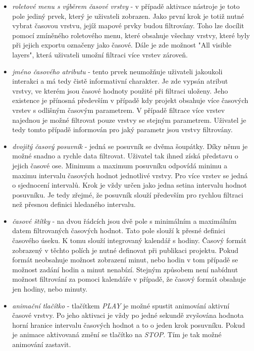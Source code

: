 \begin{itemize}
	\item\textit{roletové menu s výběrem časové vrstvy} - v případě aktivace nástroje je toto pole jediný prvek, který je uživateli zobrazen. Jako první krok je totiž nutné vybrat časovou vrstvu, jejíž mapové prvky budou filtrovány. Toho lze docílit pomocí zmíněného roletového menu, které obsahuje všechny vrstvy, které byly při jejich exportu označeny jako časové. Dále je zde možnost "All visible layers", která uživateli umožní filtraci více vrstev zároveň.
	\item\textit{jméno časového atributu} - tento prvek neumožňuje uživateli jakoukoli interakci a má tedy čistě informativní charakter. Je zde vypsán atribut vrstvy, ve kterém jsou časové hodnoty použité při filtraci uloženy. Jeho existence je přínosná především v případě kdy projekt obsahuje více časových vrstev s odlišným časovým parametrem. V případě filtrace více vrstev najednou je možné filtrovat pouze vrstvy se stejným parametrem. Uživatel je tedy tomto případě informován pro jaký parametr jsou vrstvy filtrovány.
	\item\textit{dvojitý časový posuvník} - jedná se posuvník se dvěma šoupátky. Díky němu je možné snadno a rychle data filtrovat. Uživatel tak ihned získá představu o jejich časové ose. Minimum a maximum posuvníku odpovídá minimu a maximu intervalu časových hodnot jednotlivé vrstvy. Pro více vrstev se jedná o sjednocení intervalů. Krok je vždy určen jako jedna setina intervalu hodnot posuvníku. Je tedy zřejmé, že posuvník slouží především pro rychlou filtraci než přesnou definici hledaného intervalu. 
	\item\textit{časové štítky} - na dvou řádcích jsou dvě pole s minimálním a maximálním datem filtrovaných časových hodnot. Tato pole slouží k přesné definici časového úseku. K tomu slouží integrovaný kalendář s hodiny. Časový formát zobrazený v těchto polích je nutné definovat při publikaci projektu. Pokud formát neobsahuje možnost zobrazení minut, nebo hodin v tom případě se možnost zadání hodin a minut nenabízí. Stejným způsobem není nabídnut možnost filtrování za pomoci kalendáře v případě, že časový formát obsahuje jen hodiny, nebo minuty.
	\item\textit{animační tlačítko} - tlačítkem \textit{PLAY} je možné spustit animování aktivní časové vrstvy. Po jeho aktivaci je vždy po jedné sekundě zvyšována hodnota horní hranice intervalu časových hodnot a to o jeden krok posuvníku. Pokud je animace aktivovaná změní se tlačítko na \textit{STOP}. Tím je tak možné animování zastavit.
\end{itemize}

